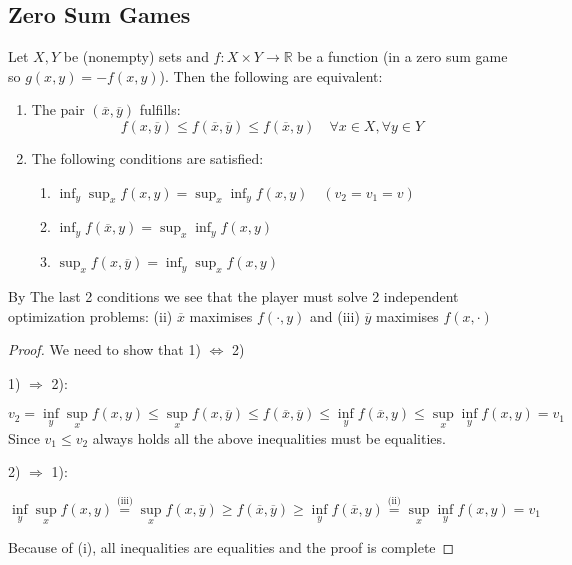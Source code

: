 \documentclass[../main.tex]{subfiles}
\begin{document}
\subsection{Zero Sum Games}
\vspace{0.25cm}
\begin{theorem}
    Let $X,Y$ be (nonempty) sets and $f: X \times Y \to \mathbb{R}$ be a function (in a zero sum game so $g(x,y) = -f(x,y)$). Then the following are equivalent:
    \begin{enumerate}
        \item The pair $(\overline{x}, \overline{y})$ fulfills:
              \[
                  f(x, \overline{y}) \leq f(\overline{x}, \overline{y}) \leq f(\overline{x}, y) \quad \forall x \in X, \forall y \in Y
              \]
        \item The following conditions are satisfied:
              \begin{enumerate}[label=(\roman*)]
                  \item $\inf_y \sup_x f(x,y) = \sup_x \inf_y f(x,y)\quad (v_2 = v_1 = v)$
                  \item $\inf_y f(\overline{x}, y) = \sup_x \inf_y f(x,y)$
                  \item $\sup_x f(x, \overline{y}) = \inf_y \sup_x f(x,y)$
              \end{enumerate}
    \end{enumerate}
\end{theorem}

By The last 2 conditions we see that the player must solve 2 independent optimization problems: (ii) $\overline{x}$ maximises $f(\cdot, y)$ and (iii) $\overline{y}$ maximises $f(x, \cdot)$
\begin{proof} We need to show that 1) $\Leftrightarrow$ 2)

    1) $\Rightarrow$ 2):

    \[
        v_2 = \inf_y \sup_x f(x,y) \leq \sup_x f(x, \overline{y}) \leq f(\overline{x}, \overline{y}) \leq \inf_y f(\overline{x}, y) \leq \sup_x \inf_y f(x,y) = v_1
    \]
    Since $v_1 \leq v_2$ always holds all the above inequalities must be equalities.

    2) $\Rightarrow$ 1):

    \[
        \inf_y \sup_x f(x,y) \overset{\text{(iii)}}{=} \sup_x f(x, \overline{y}) \geq f(\overline{x}, \overline{y}) \geq \inf_y f(\overline{x}, y) \overset{\text{(ii)}}{=} \sup_x \inf_y f(x,y) = v_1
    \]

    Because of (i), all inequalities are equalities and the proof is complete
\end{proof}
\end{document}

